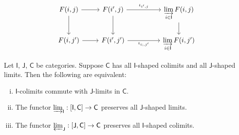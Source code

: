 \begin{prf}
\[\begin{tikzcd}
            {F(i,j)} \arrow[d] \arrow[r]                                                                                      & {F(i',j)} \arrow[d] \arrow[rr, "{\iota_{i',j}}"]                                                                      &                                                                                                    & {\varinjlim\limits_{i\in\mathsf{I}} F(i,j)} \arrow[d]                                     \\
            {F(i,j')} \arrow[r]                                                                                               & {F(i',j')} \arrow[rr, "{\iota_{i;,j'}}"']                                                                             &                                                                                                    & {\varinjlim\limits_{i\in\mathsf{I}} F(i,j')}                                             
            \end{tikzcd}
            \]
\end{prf}

\begin{proposition}{}{}
    Let $\mathsf{I}$, $\mathsf{J}$, $\mathsf{C}$ be categories. Suppose $\mathsf{C}$ has all $\mathsf{I}$-shaped colimits and all $\mathsf{J}$-shaped limits. Then the following are equivalent:
    \begin{enumerate}[(i)]
        \item $\mathsf{I}$-colimits commute with $\mathsf{J}$-limits in $\mathsf{C}$.
        \item The functor $\varinjlim_{\mathsf{I}}:[\mathsf{I},\mathsf{C}]\to \mathsf{C}$ preserves all $\mathsf{J}$-shaped limits.
        \item The functor $\varprojlim_{\mathsf{J}}:[\mathsf{J},\mathsf{C}]\to \mathsf{C}$ preserves all $\mathsf{I}$-shaped colimits.
    \end{enumerate}
\end{proposition}

